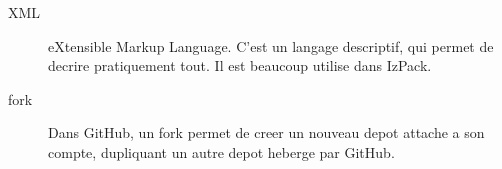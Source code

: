\begin{description}
	\item[XML] eXtensible Markup Language. C'est un langage descriptif, qui permet de decrire pratiquement tout. Il est beaucoup utilise dans IzPack.
	\item[fork] Dans GitHub, un fork permet de creer un nouveau depot attache a son compte, dupliquant un autre depot heberge par GitHub.
\end{description}

